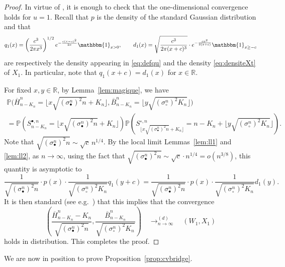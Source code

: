 \documentclass[10pt]{amsart}
\theoremstyle{definition}\newtheorem{defi}[theo]{Definition}\newtheorem{rema}[theo]{Remark}\newtheorem{exam}[theo]{Example}\newtheorem{exem}[theo]{Example}\newtheorem{nota}[theo]{Notation}
\newcommand{\R}{\mathbb{R}}
\def\scn{\sigma_{\circ}^{n}}
\def\sbn{\sigma_{\bullet}^{n}}
\def\Sbn{S^{\bullet,n}}
\def\Scn{S^{\circ,n}}
\def\oB{\overline{B}}
\def\oH{\overline{H}}
\renewcommand\Pr[1]{\mathbb{P}\left(#1\right)}
\newcommand\Prb[1]{\mathbb{P}\big(#1\big)}
\begin{document}
\begin{proof}
In virtue of \cite[Theorem 16.14]{Kal02}, it is enough to check that the one-dimensional convergence holds for $u=1$. Recall that $p$ is the density of the standard Gaussian distribution and that
\[q_{1}(x)=\left( \frac{ c^{3}}{2 \pi x^{3}} \right)^{1/2} e ^{  - \frac{c (x-c)^{2} }{2x} } \mathbbm{1}_{x>0}, \qquad d_{1}(x) =  \sqrt{ \frac{c^3}{2 \pi (x+c)^{3}}} \cdot e^{- \frac{c x^{2}}{2(x+c)}}  \mathbbm{1}_{x \geq -c}\]
are respectively the density appearing in \eqref{eq:defqu} and the density \eqref{eq:densiteXt} of $X_{1}$. In particular, note that $q_{1}(x+c)=d_{1}(x)$ for $x \in \R$.


For fixed $x,y \in \R$, by Lemma~\ref{lem:magique}, we have
\begin{multline*}
  \Prb{\overline{H}^{n}_{  n-K_{n} }= \lfloor x\sqrt{ (\sbn)^{2} n} +K_{n} \rfloor ,\oB^{n}_{  n-K_{n}}= \lfloor y \sqrt{ (\scn)^{2} K_{n}} \rfloor} \\
=\Pr{ \Sbn_{ n-K_{n} }=  \lfloor x\sqrt{ (\sbn)^{2} n} +K_{n} \rfloor} \Pr{\Scn_{ \lfloor x\sqrt{ (\sbn)^{2} n} +K_{n} \rfloor }= n-K_{n}  + \lfloor y \sqrt{ (\scn)^{2} K_{n}} \rfloor}.
\end{multline*}
Note that $\sqrt{ (\sbn)^{2} n} \sim \sqrt{c} \, n^{1/4}$. By the local limit  Lemmas~\ref{lem:ll1} and \ref{lem:ll2}, as $n \rightarrow \infty$, using the fact that $\sqrt{ (\sbn)^{2} n} \sim \sqrt{c}\cdot n^{1/4}=o(n^{3/8})$, this quantity is asymptotic to
\[ \frac{1}{ \sqrt{ (\sbn)^{2} n}  } \cdot   p \left(x\right)  \cdot  \frac{1}{\sqrt{ (\scn)^{2} K_{n}}} q_{1} \left( y+c \right)=\frac{1}{ \sqrt{ (\sbn)^{2} n}  } \cdot   p \left(x\right)  \cdot  \frac{1}{\sqrt{ (\scn)^{2} K_{n}}} d_{1}(y).\]
It is then standard (see e.g.~\cite[Theorem 7.8]{Bil68}) that this implies that the convergence
  \[ \left(  \frac{\oH^{n}_{   n-K_{n} } -  K_{n} }{\sqrt{ (\sbn)^{2} n} },  \frac{\oB^{n}_{   n-K_{n}  }}{\sqrt{ (\scn)^{2} K_{n}}} \right)  \quad \mathop{\longrightarrow}^{(d)}_{n \rightarrow \infty} \quad  (W_{1},X_{1})\]
  holds in distribution. This completes the proof.\end{proof}






We are now in position to prove Proposition~\ref{prop:cvbridge}.
\end{document}
